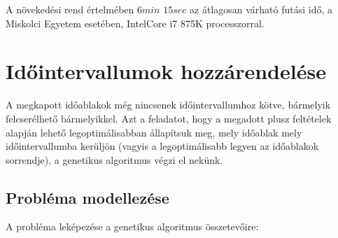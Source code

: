 \documentclass[12pt,a4paper]{report}
\begin{document}
A növekedési rend értelmében $6min$ $15sec$ az átlagosan várható futási idő, a Miskolci Egyetem esetében, IntelCore i7 875K processzorral. 

\section{Időintervallumok hozzárendelése}

A megkapott időablakok még nincsenek időintervallumhoz kötve, bármelyik felcserélhető bármelyikkel. Azt a feladatot, hogy a megadott plusz feltételek alapján lehető legoptimálisabban állapítsuk meg, mely időablak mely időintervallumba kerüljön (vagyis a legoptimálisabb legyen az időablakok sorrendje), a genetikus algoritmus végzi el nekünk.

\subsection{Probléma modellezése}

\noindent A probléma leképezése a genetikus algoritmus összetevőire:
\end{document}
